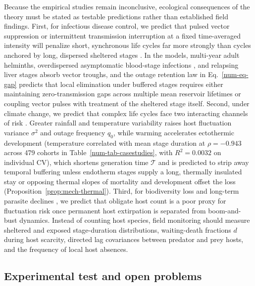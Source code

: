 Because the empirical studies remain inconclusive, ecological consequences of the theory must be stated as testable predictions rather than established field findings. First, for infectious disease control, we predict that pulsed vector suppression or intermittent transmission interruption at a fixed time-averaged intensity will penalize short, synchronous life cycles far more strongly than cycles anchored by long, dispersed sheltered stages \citep{smith2007,colley2014,anderson2015,gurarie2018}. In the models, multi-year adult helminths, overdispersed asymptomatic blood-stage infections \citep{andrade2020}, and relapsing liver stages \citep{white2016} absorb vector troughs, and the outage retention law in Eq.~\eqref{num-eq-gap} predicts that local elimination under buffered stages requires either maintaining zero-transmission gaps across multiple mean reservoir lifetimes or coupling vector pulses with treatment of the sheltered stage itself. Second, under climate change, we predict that complex life cycles face two interacting channels of risk \citep{morris2008,molnar2013,kutz2014,aleuy2020}. Greater rainfall and temperature variability raises host fluctuation variance $\sigma^2$ and outage frequency $q_0$, while warming accelerates ectothermic development (temperature correlated with mean stage duration at $\rho = -0.943$ across 479 cohorts in Table~\ref{num-tab-casestudies}, with $R^2 = 0.0032$ on individual CV), which shortens generation time $\mathcal{T}$ and is predicted to strip away temporal buffering unless endotherm stages supply a long, thermally insulated stay or opposing thermal slopes of mortality and development offset the loss (Proposition~\ref{prop:mech-thermal}). Third, for biodiversity loss and long-term parasite declines \citep{lafferty2009,lafferty2012,lagrue2015,wood2023}, we predict that obligate host count is a poor proxy for fluctuation risk once permanent host extirpation is separated from boom-and-bust dynamics. Instead of counting host species, field monitoring should measure sheltered and exposed stage-duration distributions, waiting-death fractions $d$ during host scarcity, directed lag covariances between predator and prey hosts, and the frequency of local host absences.

\subsection{Experimental test and open problems}\label{subsec:disc-open}

